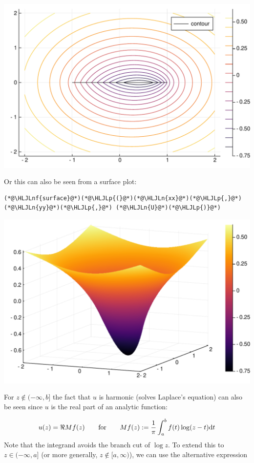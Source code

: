 \documentclass[12pt,a4paper]{article}
\newcommand{\HLJLn}[1]{#1}
\newcommand{\HLJLnf}[1]{\textcolor[RGB]{66,102,213}{#1}}
\newcommand{\HLJLp}[1]{#1}
\def\qqfor{\qquad\hbox{for}\qquad}
\def\D{ {\rm d} }
\def\dt{\D t}
\begin{document}
\includegraphics[width=\linewidth]{figures/Lecture17_1_1.pdf}

Or this can also be seen from a surface plot:


\begin{lstlisting}
(*@\HLJLnf{surface}@*)(*@\HLJLp{(}@*)(*@\HLJLn{xx}@*)(*@\HLJLp{,}@*) (*@\HLJLn{yy}@*)(*@\HLJLp{,}@*) (*@\HLJLn{U}@*)(*@\HLJLp{)}@*)
\end{lstlisting}

\includegraphics[width=\linewidth]{figures/Lecture17_2_1.pdf}

For $z \notin (-\infty,b]$ the fact that $u$ is harmonic (solves Laplace's equation)  can also be seen since $u$ is the real part of an analytic function:

\[
    u(z) = \Re Mf(z) \qqfor  Mf(z) := {1 \over \pi} \int_a^b f(t) \log ( z - t) \dt
\]
Note that the integrand avoids the branch cut of $\log z$. To extend this to $z\in (-\infty,a]$  (or more generally, $z \notin [a,\infty)$), we can use the alternative expression
\end{document}
